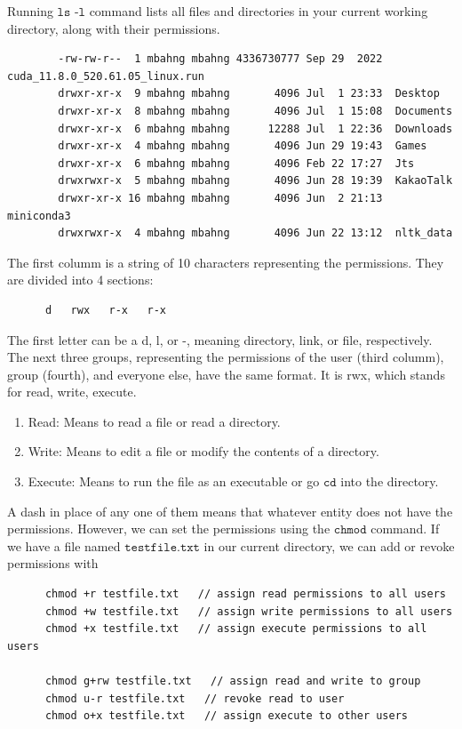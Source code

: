 \documentclass{article}
\begin{document}
      Running $\texttt{ls -l}$ command lists all files and directories in your current working directory, along with their permissions. 
      \begin{lstlisting}
        -rw-rw-r--  1 mbahng mbahng 4336730777 Sep 29  2022  cuda_11.8.0_520.61.05_linux.run
        drwxr-xr-x  9 mbahng mbahng       4096 Jul  1 23:33  Desktop
        drwxr-xr-x  8 mbahng mbahng       4096 Jul  1 15:08  Documents
        drwxr-xr-x  6 mbahng mbahng      12288 Jul  1 22:36  Downloads
        drwxr-xr-x  4 mbahng mbahng       4096 Jun 29 19:43  Games
        drwxr-xr-x  6 mbahng mbahng       4096 Feb 22 17:27  Jts
        drwxrwxr-x  5 mbahng mbahng       4096 Jun 28 19:39  KakaoTalk
        drwxr-xr-x 16 mbahng mbahng       4096 Jun  2 21:13  miniconda3
        drwxrwxr-x  4 mbahng mbahng       4096 Jun 22 13:12  nltk_data
      \end{lstlisting}
      The first columm is a string of 10 characters representing the permissions. They are divided into 4 sections: 
      \begin{lstlisting}
      d   rwx   r-x   r-x 
      \end{lstlisting}
      The first letter can be a d, l, or -, meaning directory, link, or file, respectively. The next three groups, representing the permissions of the user (third columm), group (fourth), and everyone else, have the same format. It is rwx, which stands for read, write, execute. 
      \begin{enumerate}
          \item Read: Means to read a file or read a directory. 
          \item Write: Means to edit a file or modify the contents of a directory. 
          \item Execute: Means to run the file as an executable or go $\texttt{cd}$ into the directory. 
      \end{enumerate}
      A dash in place of any one of them means that whatever entity does not have the permissions. However, we can set the permissions using the $\texttt{chmod}$ command. If we have a file named $\texttt{testfile.txt}$ in our current directory, we can add or revoke permissions with 
      \begin{lstlisting}
      chmod +r testfile.txt   // assign read permissions to all users
      chmod +w testfile.txt   // assign write permissions to all users
      chmod +x testfile.txt   // assign execute permissions to all users

      chmod g+rw testfile.txt   // assign read and write to group 
      chmod u-r testfile.txt   // revoke read to user
      chmod o+x testfile.txt   // assign execute to other users 
      \end{lstlisting} 
\end{document}
